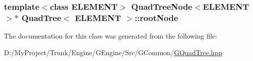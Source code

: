 \subsubsection[{root\+Node}]{\setlength{\rightskip}{0pt plus 5cm}template$<$class E\+L\+E\+M\+E\+N\+T$>$ {\bf Quad\+Tree\+Node}$<$E\+L\+E\+M\+E\+N\+T$>$$\ast$ {\bf Quad\+Tree}$<$ E\+L\+E\+M\+E\+N\+T $>$\+::root\+Node\hspace{0.3cm}{\ttfamily [protected]}}\label{class_quad_tree_a0d86bcbcea5607193be82bbd8621a34d}


The documentation for this class was generated from the following file\+:\begin{DoxyCompactItemize}
\item 
D\+:/\+My\+Project/\+Trunk/\+Engine/\+G\+Engine/\+Src/\+G\+Common/\hyperlink{_g_quad_tree_8hpp}{G\+Quad\+Tree.\+hpp}\end{DoxyCompactItemize}
